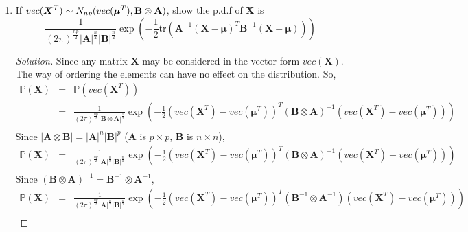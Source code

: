 \documentclass[10pt,a4paper]{article}
\def\BP{{\mathbb P}}
\def\tha{\mbox{\boldmath$\theta$\unboldmath}}
\def\aph{\mbox{\boldmath$\alpha$\unboldmath}}
\def\A{{\bm A}}
\def\B{{\bm B}}
\def\X{{\bm X}}
\def\x{{\bm x}}
\def\bmu{{\bm \mu}}
\begin{document}
\begin{enumerate}
\begin{proof}[Solution]
\begin{equation*}
\end{equation*}
where $x_1+\cdots+x_k = n, \,\theta_1+\cdots+\theta_k=1$.
\begin{equation*}
			\BP(\tha|\aph) = \frac{\Gamma(\sum_{i=1}^{k}\alpha_i)}{\prod_{i=1}^{k}\Gamma(\alpha_i)}\theta_1^{\alpha_1-1}\cdots \theta_k^{\alpha_k-1}
\end{equation*}
So,
\begin{eqnarray*} 
\BP(\theta|\X) &\propto& \BP(\X|\tha)\BP(\tha|\aph) \\
&\propto& \frac{n!}{\prod_{i=1}^k x_i!}\prod_{i=1}^k \theta_i^{x_i}\frac{\Gamma(\sum_{i=1}^{k}\alpha_i)}{\prod_{i=1}^{k}\Gamma(\alpha_i)}\theta_1^{\alpha_1-1}\cdots \theta_k^{\alpha_k-1} \\
&\propto& \frac{n!}{\prod_{i=1}^k x_i!}\frac{\Gamma(\sum_{i=1}^{k}\alpha_i)}{\prod_{i=1}^{k}\Gamma(\alpha_i)}\theta_1^{x_1+\alpha_1-1}\cdots \theta_k^{x_k+\alpha_k-1} \\
\end{eqnarray*}
Ignoring the constant part, we can see it's also a Dirichlet distribution.
$$
\BP(\tha | \X) \sim Dir(\tha | \x+\aph)
$$
\end{proof}
\item If $vec(\X^T) \sim N_{np}(vec(\bmu^T),\bf{B}\otimes\bf{A})$, show the p.d.f of $\X$ is
$$
\frac{1}{(2\pi)^{\frac{np}{2}}|\A|^{\frac{n}{2}}|\B|^{\frac{n}{2}}}\exp(-\frac{1}{2}\mbox{tr}(\A^{-1}(\X-\bmu)^T\B^{-1}(\X-\bmu)))
$$
\begin{proof}[Solution]\let\qed\relax
Since any matrix $\X$ may be considered in the vector form $vec(\X)$. The way of ordering the elements can have no effect on the distribution. So,
\begin{eqnarray*}
\BP(\X) &=& \BP(vec(\X^T)) \\
&=& \frac{1}{(2\pi)^{\frac{np}{2}}|\B\otimes\A|^{\frac{1}{2}}}\exp(-\frac{1}{2}(vec(\X^T)-vec(\bmu^T))^T(\B\otimes\A)^{-1}(vec(\X^T)-vec(\bmu^T))) \\
\end{eqnarray*}
Since $|\A\otimes \B| = |\A|^n |\B|^p$  ($\A$ is $p\times p$, $\B$ is $n\times n$),
\begin{eqnarray*}
\BP(\X) &=& \frac{1}{(2\pi)^{\frac{np}{2}}|\A|^{\frac{n}{2}}|\B|^{\frac{n}{2}}}\exp(-\frac{1}{2}(vec(\X^T)-vec(\bmu^T))^T(\B\otimes\A)^{-1}(vec(\X^T)-vec(\bmu^T))) \\
\end{eqnarray*}
Since $(\B\otimes\A)^{-1}=\B^{-1}\otimes\A^{-1}$,
\begin{eqnarray*}
\BP(\X) &=& \frac{1}{(2\pi)^{\frac{np}{2}}|\A|^{\frac{n}{2}}|\B|^{\frac{n}{2}}}\exp(-\frac{1}{2}(vec(\X^T)-vec(\bmu^T))^T(\B^{-1}\otimes\A^{-1})(vec(\X^T)-vec(\bmu^T))) \\

\end{eqnarray*}
\end{proof}
\end{enumerate}
\end{document}
